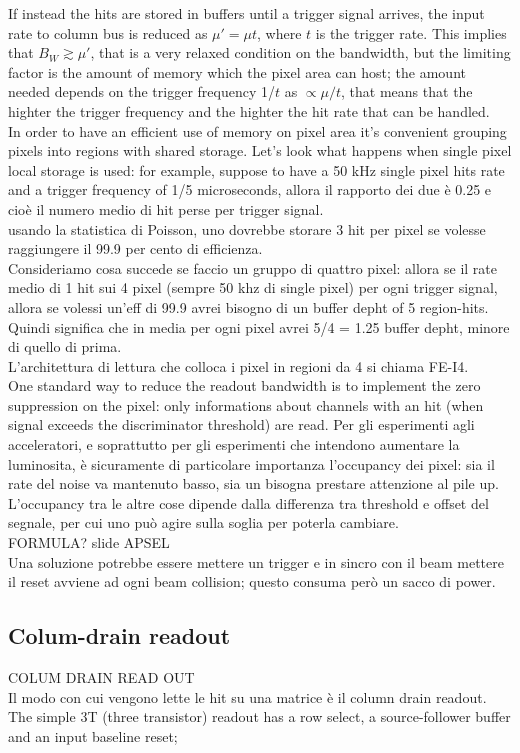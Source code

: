    If instead the hits are stored in buffers until a trigger signal arrives, the input rate
   to column bus is reduced as $\mu'=\mu t$, where $t$ is the trigger rate.
   This implies that $B_{W} \gtrsim \mu'$, that is a very relaxed condition on the
   bandwidth, but the limiting factor is the amount of memory  which the pixel area
   can host; the amount needed depends on the trigger frequency 1/$t$ as
   $\propto\mu/t$, that means that the highter the trigger frequency and the highter
   the hit rate that can be handled. \\
   In order to have an efficient use of memory on pixel area it's convenient
   grouping pixels into regions with shared storage. Let's look what happens when
   single pixel local storage is used: for example, suppose to have a 50 kHz single
   pixel hits rate and a trigger frequency of 1/5 microseconds, allora il rapporto dei due
   è 0.25 e cioè il numero medio di hit perse per trigger signal.\\
   usando la statistica di Poisson, uno dovrebbe storare 3 hit per pixel se volesse
   raggiungere il 99.9 per cento di efficienza.\\
   Consideriamo cosa succede se faccio un gruppo di quattro pixel: allora se il rate
   medio di 1 hit sui 4 pixel (sempre 50 khz di single pixel) per ogni trigger signal, allora se volessi un'eff di 99.9
   avrei bisogno di un buffer depht of 5 region-hits. Quindi significa che in media per
   ogni pixel avrei 5/4 = 1.25 buffer depht, minore di quello di prima.\\
   L'architettura di lettura che colloca i pixel in regioni da 4 si chiama FE-I4.\\

   One standard way to reduce the readout bandwidth is to implement the zero suppression
   on the pixel: only informations about channels with an hit (when signal exceeds
   the discriminator threshold) are read.
   Per gli esperimenti agli acceleratori, e soprattutto per gli esperimenti che
   intendono aumentare la luminosita, è sicuramente di particolare importanza
   l'occupancy dei pixel: sia il rate del noise va mantenuto basso, sia un
   bisogna prestare attenzione al pile up.
   L'occupancy tra le altre cose dipende dalla differenza tra threshold e offset del
   segnale, per cui uno può agire sulla soglia per poterla cambiare.\\
   FORMULA? slide APSEL\\
   Una soluzione potrebbe essere mettere un trigger e in sincro con il beam mettere
   il reset avviene ad ogni beam collision; questo consuma però un sacco di power. \\

   \subsection{Colum-drain readout}
      COLUM DRAIN READ OUT\\
      Il modo con cui vengono lette le hit su una matrice è il column drain readout.\\
      The simple 3T (three transistor) readout has a row select, a
      source-follower buffer and an input baseline reset;

